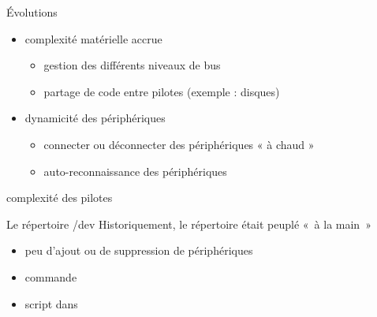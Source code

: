 \begin {frame} {Évolutions}
    \begin {itemize}
	\item complexité matérielle accrue

	    \begin {itemize}
		\item gestion des différents niveaux de bus
		\item partage de code entre pilotes (exemple : disques)
	    \end {itemize}

	\item dynamicité des périphériques

	    \begin {itemize}
		\item connecter ou déconnecter des périphériques « à chaud »
		\item auto-reconnaissance des périphériques
	    \end {itemize}
    \end {itemize}

    \implique complexité des pilotes
\end {frame}




\begin {frame} {Le répertoire /dev}
    Historiquement, le répertoire  était peuplé «~à
    la main~»

    \begin {itemize}
	\item peu d'ajout ou de suppression de périphériques
	\item commande 
	\item script  dans 
    \end {itemize}
\end {frame}

